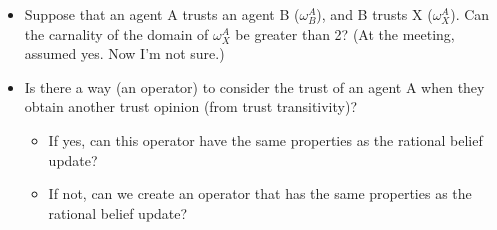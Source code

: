 \documentclass[a4paper,12pt]{article}
\theoremstyle{definition}
\numberwithin{equation}{section}
\begin{document}
\begin{itemize}
	\item Suppose that an agent A trusts an agent B ($\omega^A_B$), and B trusts X ($\omega^A_X$). Can the carnality of the domain of $\omega^A_X$ be greater than 2? (At the meeting, assumed yes. Now I'm not sure.)
	
	\item Is there a way (an operator) to consider the trust of an agent A when they obtain another trust opinion (from trust transitivity)?
	
	\begin{itemize}
		\item If yes, can this operator have the same properties as the rational belief update?
		
		\item If not, can we create an operator that has the same properties as the rational belief update?
	\end{itemize}
\end{itemize}




\end{document}
